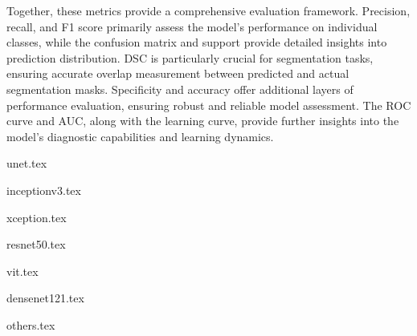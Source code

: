 Together, these metrics provide a comprehensive evaluation framework. Precision, recall, and F1 score primarily assess the model's performance on individual classes, while the confusion matrix and support provide detailed insights into prediction distribution. DSC is particularly crucial for segmentation tasks, ensuring accurate overlap measurement between predicted and actual segmentation masks. Specificity and accuracy offer additional layers of performance evaluation, ensuring robust and reliable model assessment. The ROC curve and AUC, along with the learning curve, provide further insights into the model's diagnostic capabilities and learning dynamics.




{unet.tex}

{inceptionv3.tex}

{xception.tex}

{resnet50.tex}

{vit.tex}

{densenet121.tex}

{others.tex}
